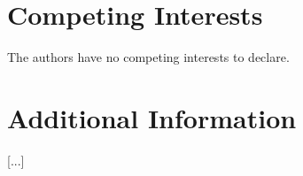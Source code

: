 \documentclass[10pt]{article}
\begin{document}
\begin{multicols}{2}
\section*{Competing Interests}
The authors have no competing interests to declare. 

\section*{Additional Information}
[...]












\end{multicols}
\end{document}
